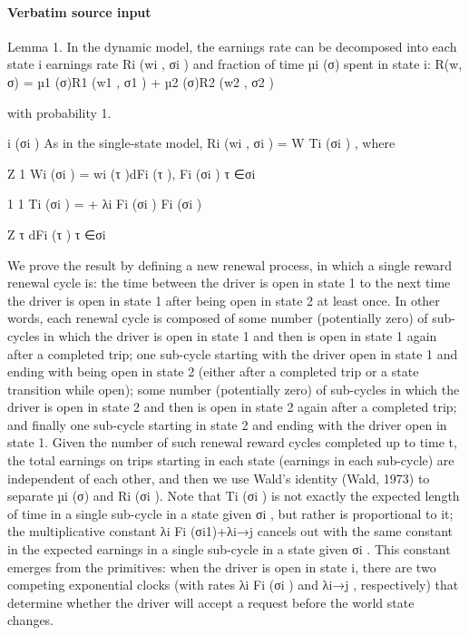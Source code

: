 \documentclass[10pt]{article}
\begin{document}
\paragraph{Verbatim source input}
\begin{ReviewVerbatim}
Lemma 1. In the dynamic model, the earnings rate can be decomposed into each state i earnings
rate Ri (wi , σi ) and fraction of time µi (σ) spent in state i:
R(w, σ) = µ1 (σ)R1 (w1 , σ1 ) + µ2 (σ)R2 (w2 , σ2 )

with probability 1.

i (σi )
As in the single-state model, Ri (wi , σi ) = W
Ti (σi ) , where

Z
1
Wi (σi ) =
wi (τ )dFi (τ ),
Fi (σi ) τ ∈σi

1
1
Ti (σi ) =
+
λi Fi (σi ) Fi (σi )

Z
τ dFi (τ )
τ ∈σi

We prove the result by defining a new renewal process, in which a single reward renewal cycle
is: the time between the driver is open in state 1 to the next time the driver is open in state 1
after being open in state 2 at least once. In other words, each renewal cycle is composed of some
number (potentially zero) of sub-cycles in which the driver is open in state 1 and then is open in
state 1 again after a completed trip; one sub-cycle starting with the driver open in state 1 and
ending with being open in state 2 (either after a completed trip or a state transition while open);
some number (potentially zero) of sub-cycles in which the driver is open in state 2 and then is open
in state 2 again after a completed trip; and finally one sub-cycle starting in state 2 and ending with
the driver open in state 1.
Given the number of such renewal reward cycles completed up to time t, the total earnings on
trips starting in each state (earnings in each sub-cycle) are independent of each other, and then we
use Wald’s identity (Wald, 1973) to separate µi (σ) and Ri (σi ).
Note that Ti (σi ) is not exactly the expected length of time in a single sub-cycle in a state
given σi , but rather is proportional to it; the multiplicative constant λi Fi (σi1)+λi→j cancels out with
the same constant in the expected earnings in a single sub-cycle in a state given σi . This constant
emerges from the primitives: when the driver is open in state i, there are two competing exponential
clocks (with rates λi Fi (σi ) and λi→j , respectively) that determine whether the driver will accept a
request before the world state changes.
\end{ReviewVerbatim}
\end{document}
